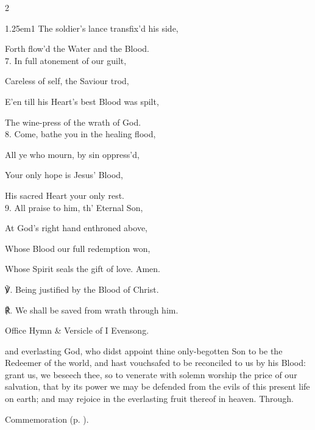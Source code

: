 \begin{paracol}{2}
\begin{hangparas}{1.25em}{1}
The soldier’s lance transfix'd his side,

Forth flow'd the Water and the Blood.\\

7. In full atonement of our guilt,

Careless of self, the Saviour trod,

E’en till his Heart’s best Blood was spilt,

The wine-press of the wrath of God.\\

8. Come, bathe you in the healing flood,

All ye who mourn, by sin oppress'd,

Your only hope is Jesus’ Blood,

His sacred Heart your only rest.\\

9. All praise to him, th' Eternal Son,

At God’s right hand enthroned above,

Whose Blood our full redemption won,

Whose Spirit seals the gift of love. Amen.\\
\end{hangparas}

℣. Being justified by the Blood of Christ.

℟. We shall be saved from wrath through him.


\fussy	
\end{paracol}

\secondEvensong
{}

\secondEvensongHymn
\begin{rubric}
	Office Hymn \& Versicle of I Evensong.
\end{rubric}


\collect
{} and everlasting God, who didst appoint thine only-begotten Son to be the Redeemer of the world, and hast vouchsafed to be reconciled to us by his Blood: grant us, we beseech thee, so to venerate with solemn worship the price of our salvation, that by its power we may be defended from the evils of this present life on earth; and may rejoice in the everlasting fruit thereof in heaven. Through.
\begin{rubric}
    Commemoration  (p. \pageref{JohnBaptistCollect}).
\end{rubric}


